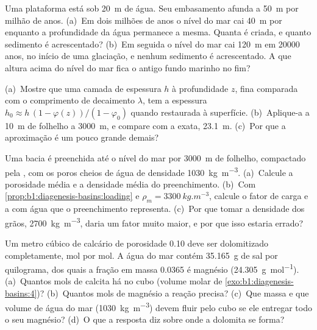 \begin{exercise}[$\star\star$]\label{exo:b1:diagenesis-basins:9}
Uma plataforma está sob \qty{20}{m} de água. Seu embasamento afunda a \qty{50}{m} por milhão
de anos. (a)~Em dois milhões de anos o nível do mar cai \qty{40}{m} por  enquanto a
profundidade da água permanece a mesma. Quanta  é criada, e quanto sedimento é
acrescentado? (b)~Em seguida o nível do mar cai \qty{120}{m} em \num{20000} anos, no início de
uma glaciação, e nenhum sedimento é acrescentado. A que altura acima do nível do mar fica o
antigo fundo marinho no fim?
\end{exercise}

\begin{exercise}[$\star\star\star$]\label{exo:b1:diagenesis-basins:10}
(a)~Mostre que uma camada de espessura $h$ à profundidade $z$, fina comparada com o
comprimento de decaimento $\lambda$, tem a espessura $h_0 \approx h\,(1 - \varphi(z))/(1 -
\varphi_0)$ quando restaurada à superfície. (b)~Aplique-a a \qty{10}{m} de folhelho a
\qty{3000}{m}, e compare com a  exata, \qty{23.1}{m}. (c)~Por que a aproximação
é um pouco grande demais?
\end{exercise}

\begin{exercise}[$\star\star\star$]\label{exo:b1:diagenesis-basins:11}
Uma bacia é preenchida até o nível do mar por \qty{3000}{m} de folhelho, compactado pela , com os poros cheios de água de densidade \qty{1030}{kg.m^{-3}}. (a)~Calcule a
porosidade média e a densidade média do preenchimento. (b)~Com
\cref{prop:b1:diagenesis-basins:loading} e $\rho_m =
\qty{3300}{kg.m^{-3}}$, calcule o fator de carga e a  com água que o preenchimento
representa. (c)~Por que tomar a densidade dos grãos, \qty{2700}{kg.m^{-3}}, daria um fator muito
maior, e por que isso estaria errado?
\end{exercise}

\begin{exercise}[$\star\star\star$]\label{exo:b1:diagenesis-basins:12}
Um metro cúbico de calcário de porosidade \num{0.10} deve ser dolomitizado completamente, mol
por mol. A água do mar contém \qty{35.165}{g} de sal por quilograma, dos quais a fração em
massa \num{0.0365} é magnésio (\qty{24.305}{g.mol^{-1}}). (a)~Quantos mols de calcita há no
cubo (volume molar de \cref{exo:b1:diagenesis-basins:4})? (b)~Quantos mols de magnésio a
reação precisa? (c)~Que massa e que volume de água do mar (\qty{1030}{kg.m^{-3}}) devem fluir
pelo cubo se ele entregar todo o seu magnésio? (d)~O que a resposta diz sobre onde a dolomita
se forma?
\end{exercise}

